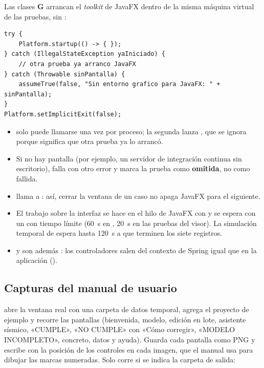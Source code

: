 Las clases \textbf{G} arrancan el \emph{toolkit} de JavaFX dentro de la misma máquina virtual de las pruebas,
sin :

\begin{verbatim}
try {
    Platform.startup(() -> { });
} catch (IllegalStateException yaIniciado) {
    // otra prueba ya arranco JavaFX
} catch (Throwable sinPantalla) {
    assumeTrue(false, "Sin entorno grafico para JavaFX: " + sinPantalla);
}
Platform.setImplicitExit(false);
\end{verbatim}

\begin{itemize}
	\item {} solo puede llamarse una vez por proceso; la segunda lanza
	      , que se ignora porque significa que otra prueba ya lo arrancó.
	\item Si no hay pantalla (por ejemplo, un servidor de integración continua sin escritorio), 
	      falla con otro error y  marca la prueba como \textbf{omitida}, no como fallida.
	\item {} llama a : así, cerrar la ventana de un
	      caso no apaga JavaFX para el siguiente.
	\item El trabajo sobre la interfaz se hace en el hilo de JavaFX con  y se espera con un
	       con tiempo límite (60~s en , 20~s en las pruebas del visor). La
	      simulación temporal de  espera hasta 120~s a que terminen los siete registros.
	\item {} y  son además : los controladores
	      salen del contexto de Spring igual que en la aplicación ().
\end{itemize}

\subsection{Capturas del manual de usuario}

 abre la ventana real con una carpeta de datos temporal, agrega el proyecto de
ejemplo y recorre las pantallas (bienvenida, modelo, edición en lote, asistente sísmico, «CUMPLE», «NO CUMPLE» con
«Cómo corregir», «MODELO INCOMPLETO», concreto, datos y ayuda). Guarda cada pantalla como PNG y escribe
 con la posición de los controles en cada imagen, que el manual usa para dibujar las marcas
numeradas. Solo corre si se indica la carpeta de salida:


